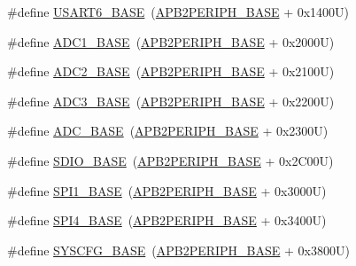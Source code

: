 \begin{DoxyCompactItemize}
\item 
\#define \hyperlink{group___peripheral__memory__map_gade4d3907fd0387ee832f426f52d568bb}{U\+S\+A\+R\+T6\+\_\+\+B\+A\+SE}~(\hyperlink{group___peripheral__memory__map_ga25b99d6065f1c8f751e78f43ade652cb}{A\+P\+B2\+P\+E\+R\+I\+P\+H\+\_\+\+B\+A\+SE} + 0x1400\+U)
\item 
\#define \hyperlink{group___peripheral__memory__map_ga695c9a2f892363a1c942405c8d351b91}{A\+D\+C1\+\_\+\+B\+A\+SE}~(\hyperlink{group___peripheral__memory__map_ga25b99d6065f1c8f751e78f43ade652cb}{A\+P\+B2\+P\+E\+R\+I\+P\+H\+\_\+\+B\+A\+SE} + 0x2000\+U)
\item 
\#define \hyperlink{group___peripheral__memory__map_ga6544abc57f9759f610eee09a02442ae6}{A\+D\+C2\+\_\+\+B\+A\+SE}~(\hyperlink{group___peripheral__memory__map_ga25b99d6065f1c8f751e78f43ade652cb}{A\+P\+B2\+P\+E\+R\+I\+P\+H\+\_\+\+B\+A\+SE} + 0x2100\+U)
\item 
\#define \hyperlink{group___peripheral__memory__map_gaca766f86c8e0b00a8e2b0224dcbb4c82}{A\+D\+C3\+\_\+\+B\+A\+SE}~(\hyperlink{group___peripheral__memory__map_ga25b99d6065f1c8f751e78f43ade652cb}{A\+P\+B2\+P\+E\+R\+I\+P\+H\+\_\+\+B\+A\+SE} + 0x2200\+U)
\item 
\#define \hyperlink{group___peripheral__memory__map_gad06cb9e5985bd216a376f26f22303cd6}{A\+D\+C\+\_\+\+B\+A\+SE}~(\hyperlink{group___peripheral__memory__map_ga25b99d6065f1c8f751e78f43ade652cb}{A\+P\+B2\+P\+E\+R\+I\+P\+H\+\_\+\+B\+A\+SE} + 0x2300\+U)
\item 
\#define \hyperlink{group___peripheral__memory__map_ga95dd0abbc6767893b4b02935fa846f52}{S\+D\+I\+O\+\_\+\+B\+A\+SE}~(\hyperlink{group___peripheral__memory__map_ga25b99d6065f1c8f751e78f43ade652cb}{A\+P\+B2\+P\+E\+R\+I\+P\+H\+\_\+\+B\+A\+SE} + 0x2\+C00\+U)
\item 
\#define \hyperlink{group___peripheral__memory__map_ga50cd8b47929f18b05efbd0f41253bf8d}{S\+P\+I1\+\_\+\+B\+A\+SE}~(\hyperlink{group___peripheral__memory__map_ga25b99d6065f1c8f751e78f43ade652cb}{A\+P\+B2\+P\+E\+R\+I\+P\+H\+\_\+\+B\+A\+SE} + 0x3000\+U)
\item 
\#define \hyperlink{group___peripheral__memory__map_gac5cfaedf263cee1e79554665f921c708}{S\+P\+I4\+\_\+\+B\+A\+SE}~(\hyperlink{group___peripheral__memory__map_ga25b99d6065f1c8f751e78f43ade652cb}{A\+P\+B2\+P\+E\+R\+I\+P\+H\+\_\+\+B\+A\+SE} + 0x3400\+U)
\item 
\#define \hyperlink{group___peripheral__memory__map_ga62246020bf3b34b6a4d8d0e84ec79d3d}{S\+Y\+S\+C\+F\+G\+\_\+\+B\+A\+SE}~(\hyperlink{group___peripheral__memory__map_ga25b99d6065f1c8f751e78f43ade652cb}{A\+P\+B2\+P\+E\+R\+I\+P\+H\+\_\+\+B\+A\+SE} + 0x3800\+U)

\end{DoxyCompactItemize}
